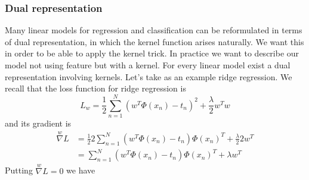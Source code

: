 \documentclass[../main.tex]{subfiles}
\begin{document}
\subsubsection{Dual representation}
Many linear models for regression and classification can be reformulated in terms of dual representation, in which the kernel function arises naturally. We want this in order to be able to apply the kernel trick. In practice we want to describe our model not using feature but with a kernel. For every linear model exist a dual representation involving kernels. Let's take as an example ridge regression.
We recall that the loss function for ridge regression is
\begin{equation*}
    L_w = \frac{1}{2}\sum_{n=1}^N (w^T\Phi(x_n) - t_n)^2 + \frac{\lambda}{2}w^T w
\end{equation*}
and its gradient is
\begin{align*}
    \overset{w}{\nabla}L & = \frac{1}{2} 2 \sum_{n=1}^N (w^T\Phi(x_n) - t_n) \Phi(x_n)^T + \frac{\lambda}{2}2 w^T \\
                         & = \sum_{n=1}^N (w^T\Phi(x_n) - t_n) \Phi(x_n)^T + \lambda w^T
\end{align*}
Putting $\overset{w}{\nabla}L = 0$ we have
\end{document}
